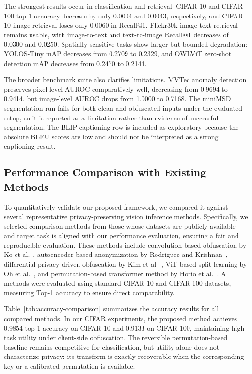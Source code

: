 \documentclass{ieeeaccess}
\newcommand{\rev}[1]{{\color{green}#1}}
\begin{document}
\rev{The strongest results occur in classification and retrieval. CIFAR-10 and CIFAR-100 top-1 accuracy decrease by only 0.0004 and 0.0043, respectively, and CIFAR-10 image retrieval loses only 0.0060 in Recall@1. Flickr30k image-text retrieval remains usable, with image-to-text and text-to-image Recall@1 decreases of 0.0300 and 0.0250. Spatially sensitive tasks show larger but bounded degradation: YOLOS-Tiny mAP decreases from 0.2709 to 0.2329, and OWLViT zero-shot detection mAP decreases from 0.2470 to 0.2144.}

\rev{The broader benchmark suite also clarifies limitations. MVTec anomaly detection preserves pixel-level AUROC comparatively well, decreasing from 0.9694 to 0.9414, but image-level AUROC drops from 1.0000 to 0.7168. The miniMSD segmentation run fails for both clean and obfuscated inputs under the evaluated setup, so it is reported as a limitation rather than evidence of successful segmentation. The BLIP captioning row is included as exploratory because the absolute BLEU scores are low and should not be interpreted as a strong captioning result.}





\subsection{Performance Comparison with Existing Methods}\label{sec:comparison}

To quantitatively validate our proposed framework, we compared it against several representative privacy-preserving vision inference methods. Specifically, we selected comparison methods from those whose datasets are publicly available and target task is aligned with our performance evaluation, ensuring a fair and reproducible evaluation. These methods include convolution-based obfuscation by Ko et al.~\cite{9129656}, autoencoder-based anonymization by Rodriguez and Krishnan~\cite{10.1007/978-3-031-37586-6_18}, differential privacy-driven obfuscation by Kim et al.~\cite{s24103166}, ViT-based split learning by Oh et al.~\cite{oh2022differentially}, and permutation-based transformer method by Horio et al.~\cite{horio2024privacypreservingvisiontransformerusing}. All methods were evaluated using standard CIFAR-10 and CIFAR-100 datasets, measuring Top-1 accuracy to ensure direct comparability.

\rev{Table~\ref{tab:accuracy-comparison} summarizes the accuracy results for all compared methods. In our CIFAR experiments, the proposed method achieves 0.9854 top-1 accuracy on CIFAR-10 and 0.9133 on CIFAR-100, maintaining high task utility under client-side obfuscation. The reversible permutation-based baseline remains competitive for classification, but utility alone does not characterize privacy: its transform is exactly recoverable when the corresponding key or a calibrated permutation is available.}
\end{document}
